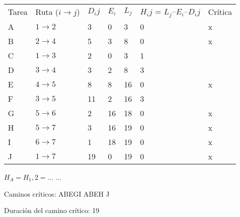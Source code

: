 \begin{table}[]
\begin{tabular}{lllllll}
Tarea & Ruta   ($i \longrightarrow j$) & $D_ij$ & $E_i$ & $L_j$ & $H_ij$   = $L_j – E_i – D_ij$ & Crítica \\
A     & $1   \longrightarrow 2$        & 3     & 0    & 3    & 0                             & x    \\
B     & $2   \longrightarrow 4$       & 5     & 3    & 8    & 0                             & x    \\
C     & $1   \longrightarrow 3$        & 2     & 0    & 3    & 1                             &      \\
D     & $3   \longrightarrow 4$        & 3     & 2    & 8    & 3                             &      \\
E     & $4   \longrightarrow 5$       & 8     & 8    & 16   & 0                             & x    \\
F     & $3   \longrightarrow 5$      & 11    & 2    & 16   & 3                             &      \\
G     & $5   \longrightarrow 6$        & 2     & 16   & 18   & 0                             & x    \\
H     & $5   \longrightarrow 7$        & 3     & 16   & 19   & 0                             & x    \\
I     & $6   \longrightarrow 7$        & 1     & 18   & 19   & 0                             & x    \\
J     & $1   \longrightarrow 7$        & 19    & 0    & 19   & 0                             & x   
\end{tabular}
\end{table}
						
$H_A = H_1,2 = ...$
...

Caminos críticos: 
ABEGI
ABEH
J

Duración del camino crítico: 19
